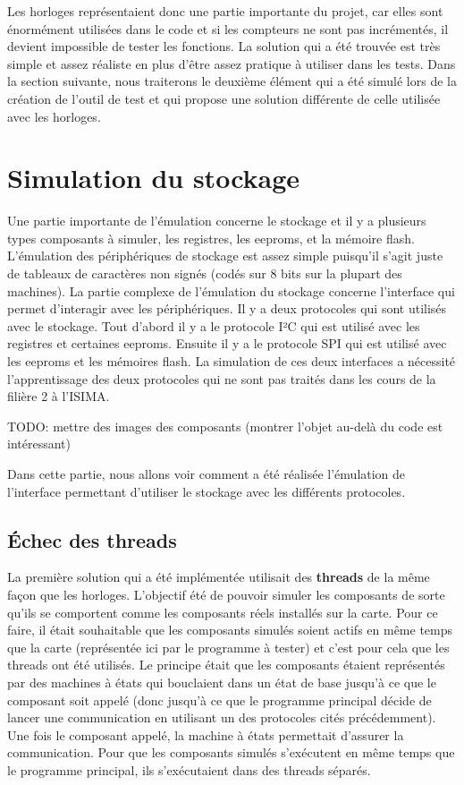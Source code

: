 \documentclass[a4paper]{article}
\begin{document}
Les horloges représentaient donc une partie importante du projet, car elles sont
énormément utilisées dans le code et si les compteurs ne sont pas incrémentés,
il devient impossible de tester les fonctions. La solution qui a été trouvée est
très simple et assez réaliste en plus d'être assez pratique à utiliser dans les
tests. Dans la section suivante, nous traiterons le deuxième élément qui a été
simulé lors de la création de l'outil de test et qui propose une solution
différente de celle utilisée avec les horloges.
\section{Simulation du stockage}%

Une partie importante de l'émulation concerne le stockage et il y a plusieurs
types composants à simuler, les registres, les eeproms, et la mémoire flash.
L'émulation des périphériques de stockage est assez simple puisqu'il s'agit
juste de tableaux de caractères non signés (codés sur 8 bits sur la plupart des
machines). La partie complexe de l'émulation du stockage concerne l'interface
qui permet d'interagir avec les périphériques. Il y a deux protocoles qui sont
utilisés avec le stockage. Tout d'abord il y a le protocole I²C qui est utilisé
avec les registres et certaines eeproms. Ensuite il y a le protocole SPI qui est
utilisé avec les eeproms et les mémoires flash. La simulation de ces deux
interfaces a nécessité l'apprentissage des deux protocoles qui ne sont pas traités
dans les cours de la filière 2 à l'ISIMA.

TODO: mettre des images des composants (montrer l'objet au-delà du code est
intéressant)

Dans cette partie, nous allons voir comment a été réalisée l'émulation de
l'interface permettant d'utiliser le stockage avec les différents protocoles.

\subsection{Échec des threads}%
\label{echecthread}

La première solution qui a été implémentée utilisait des \textbf{threads} de la
même façon que les horloges. L'objectif été de pouvoir simuler les composants de
sorte qu'ils se comportent comme les composants réels installés sur la
carte. Pour ce faire, il était souhaitable que les composants simulés soient actifs
en même temps que la carte (représentée ici par le programme à tester) et c'est
pour cela que les threads ont été utilisés. Le principe était que les composants
étaient représentés par des machines à états qui bouclaient dans un état de base
jusqu'à ce que le composant soit appelé (donc jusqu'à ce que le programme
principal décide de lancer une communication en utilisant un des protocoles
cités précédemment). Une fois le composant appelé, la machine à états permettait
d'assurer la communication. Pour que les composants simulés s'exécutent en même
temps que le programme principal, ils s'exécutaient dans des threads séparés.
\\
\end{document}
